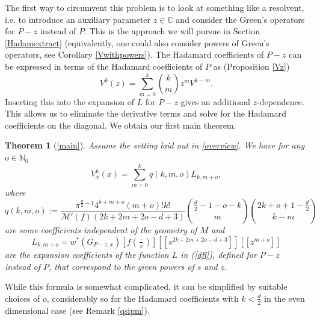 \documentclass[11pt]{article}
\def\C{{\mathbb{C}}}
\def\N{{\mathbb{N}}}
\def\M{\mathcal{M}}
\newtheorem*{thm*}{Theorem}
\begin{document}
The first way to circumvent this problem is to look at something like a resolvent, i.e. to introduce an auxiliary parameter $z\in \C$ and consider the Green's operators for $P-z$ instead of $P$. This is the approach we will pursue in Section \ref{Hadamextract} (equivalently, one could also consider powers of Green's operators, see Corollary \ref{Vwithpowers}). The Hadamard coefficients of $P-z$ can be expressed in terms of the Hadamard coefficients of $P$ as (Proposition \ref{Vz})
\[V^k(z)=\sum\limits_{m=0}^k\binom{k}{m}z^mV^{k-m}.\]
Inserting this into the expansion of $L$ for $P-z$ gives an additional $z$-dependence. This allows us to eliminate the derivative terms and solve for the Hadamard coefficients on the diagonal. We obtain our first main theorem.
\begin{thm*}[\ref{main}]
	Assume the setting laid out in \ref{overview}. We have for any $o\in \N_0$
	\[V^k_x(x)=\sum\limits_{m=0}^k q(k,m,o)L_{k,m+o},\]
	where 
	\[q(k,m,o):=\frac{\pi^{\frac{d}{2}-1}4^{k+m+o}(m+o)!k!}{\M'(f)({2k+2m+2o-d+3})}\binom{\frac{d}{2}-1-o-k}{m}\binom{2k+o+1-\frac{d}{2}}{k-m}\]
	are some coefficients independent of the geometry of $M$ and
	\[L_{k,m+o}=w^*(G_{P-z,x})[f(\tfrac{\cdot}{s})][[s^{2k+2m+2o-d+3}]][[z^{m+o}]]\]
	are the expansion coefficients of the function $L$ in (\ref{dfl}), defined for $P-z$ instead of $P$, that correspond to the given powers of $s$ and $z$.
\end{thm*}
While this formula is somewhat complicated, it can be simplified by suitable choices of $o$, considerably so for the Hadamard coefficients with $k<\tfrac{d}{2}$ in the even dimensional case (see Remark \ref{qsipm}). 
\end{document}
